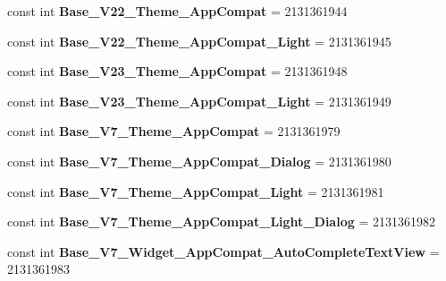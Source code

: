 \begin{DoxyCompactItemize}
const int {\bfseries Base\+\_\+\+V22\+\_\+\+Theme\+\_\+\+App\+Compat} = 2131361944
\item 
\mbox{\label{classXaria_1_1Resource_1_1Style_a090f7fd7ac48d7124d3cbcb8400b1470}} 
const int {\bfseries Base\+\_\+\+V22\+\_\+\+Theme\+\_\+\+App\+Compat\+\_\+\+Light} = 2131361945
\item 
\mbox{\label{classXaria_1_1Resource_1_1Style_a21e32ba5bb54f76d69d755dcfe31e6c9}} 
const int {\bfseries Base\+\_\+\+V23\+\_\+\+Theme\+\_\+\+App\+Compat} = 2131361948
\item 
\mbox{\label{classXaria_1_1Resource_1_1Style_a28c351abc72dec1cfa31c3604c211cd5}} 
const int {\bfseries Base\+\_\+\+V23\+\_\+\+Theme\+\_\+\+App\+Compat\+\_\+\+Light} = 2131361949
\item 
\mbox{\label{classXaria_1_1Resource_1_1Style_a7fb343be41306f2f297e3dadc574ae33}} 
const int {\bfseries Base\+\_\+\+V7\+\_\+\+Theme\+\_\+\+App\+Compat} = 2131361979
\item 
\mbox{\label{classXaria_1_1Resource_1_1Style_a3c8bf6dd0fcf73669c316159e3519f97}} 
const int {\bfseries Base\+\_\+\+V7\+\_\+\+Theme\+\_\+\+App\+Compat\+\_\+\+Dialog} = 2131361980
\item 
\mbox{\label{classXaria_1_1Resource_1_1Style_ae96328479d1f0fc8ac7f7cc611ed297a}} 
const int {\bfseries Base\+\_\+\+V7\+\_\+\+Theme\+\_\+\+App\+Compat\+\_\+\+Light} = 2131361981
\item 
\mbox{\label{classXaria_1_1Resource_1_1Style_a296466ff236e90663818dec3e3375b8b}} 
const int {\bfseries Base\+\_\+\+V7\+\_\+\+Theme\+\_\+\+App\+Compat\+\_\+\+Light\+\_\+\+Dialog} = 2131361982
\item 
\mbox{\label{classXaria_1_1Resource_1_1Style_a0ca680b8ccda51e856de9d9467307c02}} 
const int {\bfseries Base\+\_\+\+V7\+\_\+\+Widget\+\_\+\+App\+Compat\+\_\+\+Auto\+Complete\+Text\+View} = 2131361983
\item 
\mbox{\label{classXaria_1_1Resource_1_1Style_a6393f3b633498ee8d802be0ebda49a91}} 

\end{DoxyCompactItemize}
